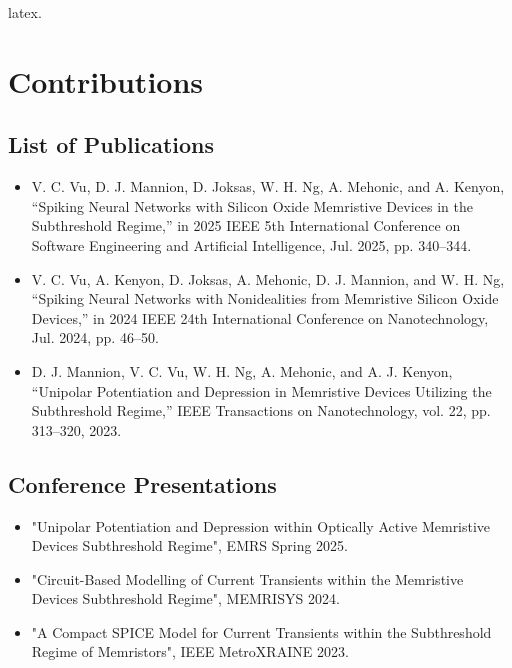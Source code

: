 
\begin{impact}      

\noindent latex.
\\

\clearpage
\thispagestyle{empty}
\section*{\centering Contributions}

\subsection*{List of Publications}
\begin{itemize}
    \item V. C. Vu, D. J. Mannion, D. Joksas, W. H. Ng, A. Mehonic, and A. Kenyon, “Spiking Neural Networks with Silicon Oxide Memristive Devices in the Subthreshold Regime,” in 2025 IEEE 5th International Conference on Software Engineering and Artificial Intelligence, Jul. 2025, pp. 340–344.
    \item V. C. Vu, A. Kenyon, D. Joksas, A. Mehonic, D. J. Mannion, and W. H. Ng, “Spiking Neural Networks with Nonidealities from Memristive Silicon Oxide Devices,” in 2024 IEEE 24th International Conference on Nanotechnology, Jul. 2024, pp. 46–50.
    \item D. J. Mannion, V. C. Vu, W. H. Ng, A. Mehonic, and A. J. Kenyon, “Unipolar Potentiation and Depression in Memristive Devices Utilizing the Subthreshold Regime,” IEEE Transactions on Nanotechnology, vol. 22, pp. 313–320, 2023.
\end{itemize}

\subsection*{Conference Presentations}

\begin{itemize}
    \item "Unipolar Potentiation and Depression within Optically Active Memristive Devices Subthreshold Regime", EMRS Spring 2025.
    \item "Circuit-Based Modelling of Current Transients within the Memristive Devices Subthreshold Regime", MEMRISYS 2024.
    \item "A Compact SPICE Model for Current Transients within the Subthreshold Regime of Memristors", IEEE MetroXRAINE 2023.
  \end{itemize}

\end{impact}
